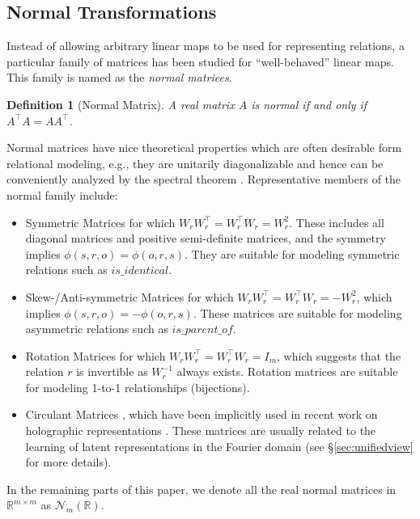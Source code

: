 \documentclass{article}
\newtheorem{definition}{Definition}[section]
\begin{document}
\subsection{Normal Transformations}
Instead of allowing arbitrary linear maps to be used for representing relations, a particular family of matrices has been studied for ``well-behaved'' linear maps.  This family is named as the \textit{normal matrices}.
\begin{definition}[Normal Matrix]
    A real matrix $A$ is normal if and only if $A^\top A = A A^\top$.
\end{definition}

Normal matrices have nice theoretical properties which are often desirable form relational modeling, e.g., they are unitarily diagonalizable and hence can be conveniently analyzed by the spectral theorem \cite{dunford1971linear}.
Representative members of the normal family include:
\begin{itemize}
    \item Symmetric Matrices for which $W_r W_r^\top = W_r^\top W_r= W_r^2 $.  These includes all diagonal matrices and positive semi-definite matrices,
        and the symmetry implies $\phi(s, r, o) = \phi(o, r, s)$.
        They are suitable for modeling symmetric relations such as $is\_identical$.
    \item Skew-/Anti-symmetric Matrices for which $W_rW_r^\top = W_r^\top W_r = -W_r^2$, which implies $\phi(s, r, o) = -\phi(o, r, s)$.
        These matrices are suitable for modeling asymmetric relations
        such as $is\_parent\_of$.
    \item Rotation Matrices for which $W_rW_r^\top  = W_r^\top W_r = I_m$,
        which suggests that the relation $r$ is invertible as $W_r^{-1}$ always exists.
        Rotation matrices are suitable for modeling 1-to-1 relationships (bijections).
    \item Circulant Matrices \cite{gray2006toeplitz},
        which have been implicitly used in recent work on holographic representations \cite{DBLP:conf/aaai/NickelRP16}.
        These matrices are usually related to the learning of latent representations in the Fourier domain
        (see \S \ref{sec:unifiedview} for more details).
\end{itemize}

In the remaining parts of this paper, we denote all the real normal matrices in $\mathbb{R}^{m \times m}$ as $\mathcal{N}_m(\mathbb{R})$.
\end{document}
